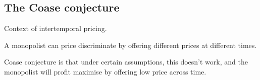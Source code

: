 
\subsection{The Coase conjecture}

Context of intertemporal pricing.

A monopolist can price discriminate by offering different prices at different times.

Coase conjecture is that under certain assumptions, this doesn't work, and the monopolist will profit maximise by offering low price across time.
